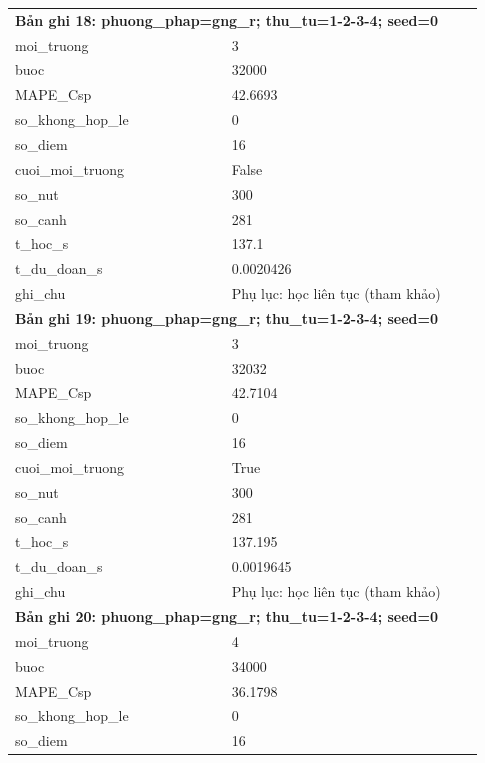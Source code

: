 \begin{longtable}{p{0.43\linewidth}p{0.50\linewidth}}
\midrule
\multicolumn{2}{p{0.95\linewidth}}{\textbf{Bản ghi 18: phuong\_phap=gng\_r; thu\_tu=1-2-3-4; seed=0}} \\
moi\_\allowbreak truong & 3 \\
buoc & 32000 \\
MAPE\_\allowbreak Csp & 42.6693 \\
so\_\allowbreak khong\_\allowbreak hop\_\allowbreak le & 0 \\
so\_\allowbreak diem & 16 \\
cuoi\_\allowbreak moi\_\allowbreak truong & False \\
so\_\allowbreak nut & 300 \\
so\_\allowbreak canh & 281 \\
t\_\allowbreak hoc\_\allowbreak s & 137.1 \\
t\_\allowbreak du\_\allowbreak doan\_\allowbreak s & 0.0020426 \\
ghi\_\allowbreak chu & Phụ lục: học liên tục (tham khảo) \\
\midrule
\multicolumn{2}{p{0.95\linewidth}}{\textbf{Bản ghi 19: phuong\_phap=gng\_r; thu\_tu=1-2-3-4; seed=0}} \\
moi\_\allowbreak truong & 3 \\
buoc & 32032 \\
MAPE\_\allowbreak Csp & 42.7104 \\
so\_\allowbreak khong\_\allowbreak hop\_\allowbreak le & 0 \\
so\_\allowbreak diem & 16 \\
cuoi\_\allowbreak moi\_\allowbreak truong & True \\
so\_\allowbreak nut & 300 \\
so\_\allowbreak canh & 281 \\
t\_\allowbreak hoc\_\allowbreak s & 137.195 \\
t\_\allowbreak du\_\allowbreak doan\_\allowbreak s & 0.0019645 \\
ghi\_\allowbreak chu & Phụ lục: học liên tục (tham khảo) \\
\midrule
\multicolumn{2}{p{0.95\linewidth}}{\textbf{Bản ghi 20: phuong\_phap=gng\_r; thu\_tu=1-2-3-4; seed=0}} \\
moi\_\allowbreak truong & 4 \\
buoc & 34000 \\
MAPE\_\allowbreak Csp & 36.1798 \\
so\_\allowbreak khong\_\allowbreak hop\_\allowbreak le & 0 \\
so\_\allowbreak diem & 16 \\

\end{longtable}
